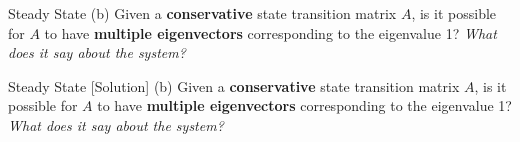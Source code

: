 \begin{frame}{Steady State}
    (b) Given a \textbf{conservative} state transition matrix $A$, is it possible for $A$ to have \textbf{multiple eigenvectors} corresponding to the eigenvalue 1? \textit{What does it say about the system?}
\end{frame}

\begin{frame}{Steady State [Solution]}
    (b) Given a \textbf{conservative} state transition matrix $A$, is it possible for $A$ to have \textbf{multiple eigenvectors} corresponding to the eigenvalue 1? \textit{What does it say about the system?} \\[2ex]
\end{frame}
